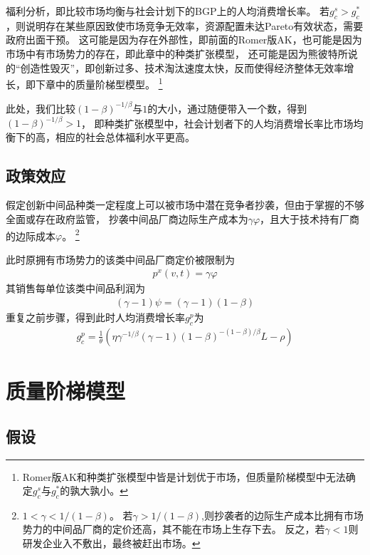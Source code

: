 \documentclass[cn,normal,11pt,black]{elegantnote}
\begin{document}
\begin{note}[市场均衡和社会计划者间的比较]
    福利分析，即比较市场均衡与社会计划下的BGP上的人均消费增长率。
    若$g_c^s > g_c^*$，则说明存在某些原因致使市场竞争无效率，资源配置未达Pareto有效状态，需要政府出面干预。
    这可能是因为存在外部性，即前面的Romer版AK，也可能是因为市场中有市场势力的存在，即此章中的种类扩张模型，
    还可能是因为熊彼特所说的“创造性毁灭”，即创新过多、技术淘汰速度太快，反而使得经济整体无效率增长，即下章中的质量阶梯型模型。
    \footnote{Romer版AK和种类扩张模型中皆是计划优于市场，但质量阶梯模型中无法确定$g_c^s$与$g_c^*$的孰大孰小。}
    
    此处，我们比较$(1-\beta)^{-1/\beta}$与$1$的大小，通过随便带入一个数，得到$(1-\beta)^{-1/\beta} > 1$，
    即种类扩张模型中，社会计划者下的人均消费增长率比市场均衡下的高，相应的社会总体福利水平更高。
\end{note}

\subsection{政策效应}

假定创新中间品种类一定程度上可以被市场中潜在竞争者抄袭，但由于掌握的不够全面或存在政府监管，
抄袭中间品厂商边际生产成本为$\gamma \varphi$，且大于技术持有厂商的边际成本$\varphi$。
\footnote{$1<\gamma < 1/(1-\beta)$。
        若$\gamma > 1/(1-\beta)$,则抄袭者的边际生产成本比拥有市场势力的中间品厂商的定价还高，其不能在市场上生存下去。
        反之，若$\gamma <1$则研发企业入不敷出，最终被赶出市场。}

此时原拥有市场势力的该类中间品厂商定价被限制为
\begin{align}
    p^x(v,t) = \gamma \varphi
\end{align}
其销售每单位该类中间品利润为
\begin{align}
    (\gamma-1) \psi=(\gamma-1)(1-\beta)
\end{align}
重复之前步骤，得到此时人均消费增长率$g_c^p$为
\begin{align}
    g_c^p = \frac{1}{\theta}\left(\eta \gamma^{-1 / \beta}(\gamma-1)(1-\beta)^{-(1-\beta) / \beta} L-\rho\right)
\end{align}

\section{质量阶梯模型}

\subsection{假设}
\end{document}
